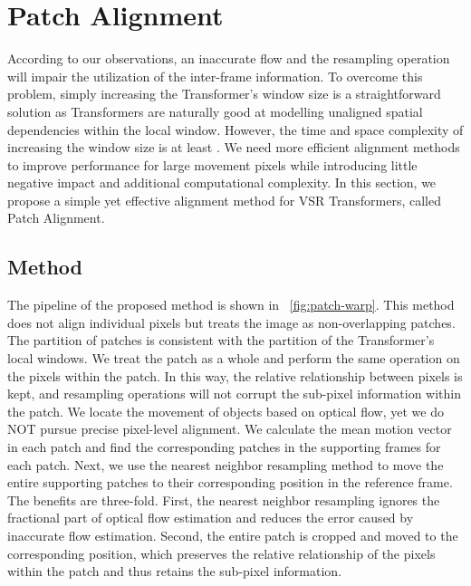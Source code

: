 \documentclass{article}
\begin{document}
\section{Patch Alignment}
\vspace{-2mm}
According to our observations, an inaccurate flow and the resampling operation will impair the utilization of the inter-frame information.
To overcome this problem, simply increasing the Transformer's window size is a straightforward solution as Transformers are naturally good at modelling unaligned spatial dependencies within the local window.
However, the time and space complexity of increasing the window size is at least .
We need more efficient alignment methods to improve performance for large movement pixels while introducing little negative impact and additional computational complexity.
In this section, we propose a simple yet effective alignment method for VSR Transformers, called Patch Alignment.


\vspace{-2mm}
\subsection{Method}
\vspace{-2mm}
The pipeline of the proposed method is shown in \figurename~\ref{fig:patch-warp}.
This method does not align individual pixels but treats the image as non-overlapping patches.
The partition of patches is consistent with the partition of the Transformer's local windows.
We treat the patch as a whole and perform the same operation on the pixels within the patch.
In this way, the relative relationship between pixels is kept, and resampling operations will not corrupt the sub-pixel information within the patch.
We locate the movement of objects based on optical flow, yet we do NOT pursue precise pixel-level alignment.
We calculate the mean motion vector in each patch and find the corresponding patches in the supporting frames for each patch.
Next, we use the nearest neighbor resampling method to move the entire supporting patches to their corresponding position in the reference frame.
The benefits are three-fold.
First, the nearest neighbor resampling ignores the fractional part of optical flow estimation and reduces the error caused by inaccurate flow estimation.
Second, the entire patch is cropped and moved to the corresponding position, which preserves the relative relationship of the pixels within the patch and thus retains the sub-pixel information.
\end{document}
